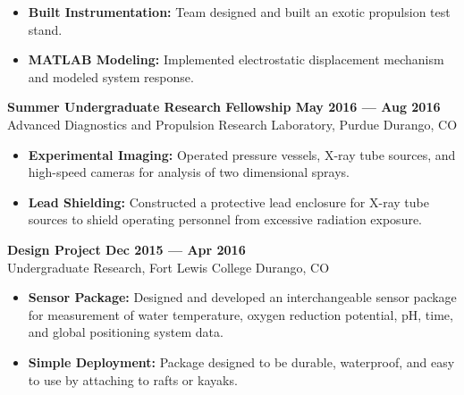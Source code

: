 \begin{itemize}
    \item \textbf{Built Instrumentation:} Team designed and built an exotic propulsion test stand.
    \item \textbf{MATLAB Modeling:} Implemented electrostatic displacement mechanism and modeled system response.
\end{itemize}

\noindent \textbf{Summer Undergraduate Research Fellowship \hfill May 2016 --- Aug 2016}\\
Advanced Diagnostics and Propulsion Research Laboratory, Purdue \dotfill Durango, CO

\begin{itemize}
    \item \textbf{Experimental Imaging:} Operated pressure vessels, X-ray tube sources, and high-speed cameras for analysis of two dimensional sprays.
    \item \textbf{Lead Shielding:} Constructed a protective lead enclosure for X-ray tube sources to shield operating personnel from excessive radiation exposure.
\end{itemize}

\noindent \textbf{Design Project \hfill Dec 2015 --- Apr 2016}\\
Undergraduate Research, Fort Lewis College \dotfill Durango, CO

\begin{itemize}
    \item \textbf{Sensor Package:} Designed and developed an interchangeable sensor package for measurement of water temperature, oxygen reduction potential, pH, time, and global positioning system data.
    \item \textbf{Simple Deployment:} Package designed to be durable, waterproof, and easy to use by attaching to rafts or kayaks.
\end{itemize}
